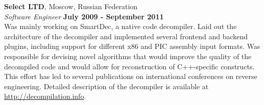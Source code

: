 \documentclass[margin,line]{CV}
\begin{document}
\begin{resume}
    
    \pagebreak    

    


    

    
    \textbf{Select LTD}, Moscow, Russian Federation \vspace{2mm}\\\vspace{1mm}%
    \textsl{Software Engineer} \hfill \textbf{July 2009 - September 2011}\\
    Was mainly working on SmartDec, a native code decompiler. Laid out the architecture of the decompiler and implemented several frontend and backend plugins, including support for different x86 and PIC assembly input formats. Was responsible for devising novel algorithms that would improve the quality of the decompiled code and would allow for reconstruction of C++-specific constructs. This effort has led to several publications on international conferences on reverse engineering. Detailed description of the decompiler is available at \url{http://decompilation.info}.


\end{resume}
\end{document}

